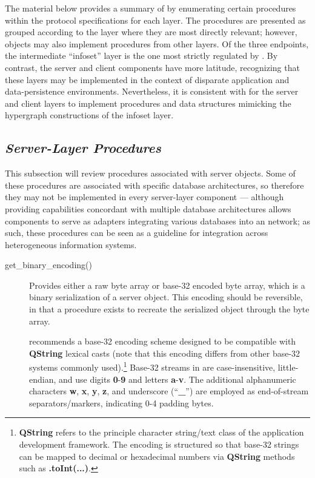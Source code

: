 \documentclass[12pt,letterpaper]{article}
\newcommand{\procitem}[1]{{#1}}
\newcommand{\HGDM}{\resizebox{!}{7.5pt}{\ATexttclr{HGDM}}}
\newcommand{\sCpp}{\resizebox{!}{6pt}{\AcronymText{C++}}}
\newcommand{\sQt}{\resizebox{!}{6pt}{\AcronymText{Qt}}}
\newcommand{\ATexttclr}[1]{\textcolor{tcolor}{\textbf{#1}}}
\newcommand{\textscc}[1]{{\color{orr!35!black}{{%
{\textsc{\textbf{#1}}}}}}}
\newcommand{\AcronymText}[1]{{\textscc{#1}}}
\newcommand{\p}[1]{

\vspace{.7em}#1}
\newcommand{\q}[1]{{\fontfamily{qcr}\selectfont ``}#1{\fontfamily{qcr}\selectfont ''}}
\begin{document}
{\p{The material below provides a summary of \HGDM{} 
by enumerating certain procedures within the protocol specifications 
for each layer.  The procedures are presented as grouped according to 
the layer where they are most directly relevant; however, objects 
may also implement procedures from other layers.  
Of the three endpoints, the intermediate \q{infoset} layer is 
the one most strictly regulated by \HGDM{}.  By contrast, 
the server and 
client components have more latitude, recognizing that 
these layers may be implemented in the context of disparate 
application and data-persistence environments.  
Nevertheless, it is consistent with \HGDM{} for the 
server and client layers to implement procedures 
and data structures mimicking the hypergraph constructions 
of the infoset layer.}

\subsection[Server-Layer Procedures]{\textit{Server-Layer Procedures}}
\p{This subsection will review procedures associated 
with server objects.  Some of these procedures are 
associated with specific database architectures, so 
therefore they may not be implemented in every \HGDM{} 
server-layer component --- although providing 
capabilities concordant with multiple database 
architectures allows components to serve as adapters 
integrating various databases into an \HGDM{} 
network; as such, these procedures can be seen 
as a guideline for integration across heterogeneous 
information systems. 

\begin{description}

\item[\procitem{get\_binary\_encoding()}]  Provides either a 
raw byte array or base-32 encoded byte array, which 
is a binary serialization of a 
server object.  This encoding should be reversible, 
in that a procedure exists to recreate the serialized 
object through the byte array.

\descindent{}  \HGDM{} recommends a base-32 encoding scheme 
designed to be compatible with \textbf{QString} lexical casts 
(note that this encoding differs from other base-32 systems 
commonly used).\footnote{\textbf{QString} refers to the 
principle character string/text class of the \sQt{} \sCpp{} 
application development framework.  The encoding 
is structured so that base-32 strings can be mapped 
to decimal or hexadecimal numbers via \textbf{QString} 
methods such as \textbf{.toInt(...)}.}  Base-32 streams 
in \HGDM{} are case-insensitive, little-endian, 
and use digits \textbf{0}-\textbf{9} and letters 
\textbf{a}-\textbf{v}.  
The additional alphanumeric characters \textbf{w}, \textbf{x}, 
\textbf{y}, \textbf{z}, and 
underscore (\q{\textbf{\_}}) are employed as end-of-stream separators/markers, 
indicating 0-4 padding bytes.


\end{description}}}
\end{document}
